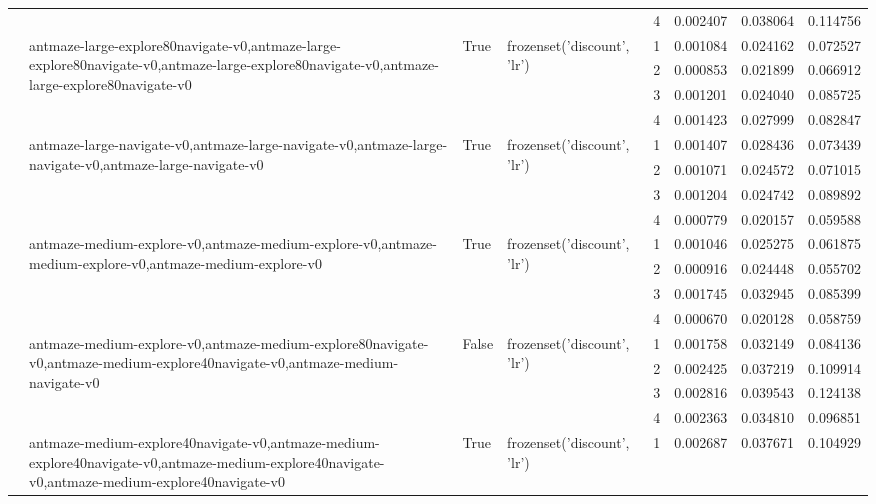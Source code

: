 \begin{tabular}{lllllrrr}
 &  &  &  & 4 & 0.002407 & 0.038064 & 0.114756 \\
\cline{2-8} \cline{3-8} \cline{4-8}
 & \multirow[t]{4}{*}{antmaze-large-explore80navigate-v0,antmaze-large-explore80navigate-v0,antmaze-large-explore80navigate-v0,antmaze-large-explore80navigate-v0} & \multirow[t]{4}{*}{True} & \multirow[t]{4}{*}{frozenset({'discount', 'lr'})} & 1 & 0.001084 & 0.024162 & 0.072527 \\
 &  &  &  & 2 & 0.000853 & 0.021899 & 0.066912 \\
 &  &  &  & 3 & 0.001201 & 0.024040 & 0.085725 \\
 &  &  &  & 4 & 0.001423 & 0.027999 & 0.082847 \\
\cline{2-8} \cline{3-8} \cline{4-8}
 & \multirow[t]{4}{*}{antmaze-large-navigate-v0,antmaze-large-navigate-v0,antmaze-large-navigate-v0,antmaze-large-navigate-v0} & \multirow[t]{4}{*}{True} & \multirow[t]{4}{*}{frozenset({'discount', 'lr'})} & 1 & 0.001407 & 0.028436 & 0.073439 \\
 &  &  &  & 2 & 0.001071 & 0.024572 & 0.071015 \\
 &  &  &  & 3 & 0.001204 & 0.024742 & 0.089892 \\
 &  &  &  & 4 & 0.000779 & 0.020157 & 0.059588 \\
\cline{2-8} \cline{3-8} \cline{4-8}
 & \multirow[t]{4}{*}{antmaze-medium-explore-v0,antmaze-medium-explore-v0,antmaze-medium-explore-v0,antmaze-medium-explore-v0} & \multirow[t]{4}{*}{True} & \multirow[t]{4}{*}{frozenset({'discount', 'lr'})} & 1 & 0.001046 & 0.025275 & 0.061875 \\
 &  &  &  & 2 & 0.000916 & 0.024448 & 0.055702 \\
 &  &  &  & 3 & 0.001745 & 0.032945 & 0.085399 \\
 &  &  &  & 4 & 0.000670 & 0.020128 & 0.058759 \\
\cline{2-8} \cline{3-8} \cline{4-8}
 & \multirow[t]{4}{*}{antmaze-medium-explore-v0,antmaze-medium-explore80navigate-v0,antmaze-medium-explore40navigate-v0,antmaze-medium-navigate-v0} & \multirow[t]{4}{*}{False} & \multirow[t]{4}{*}{frozenset({'discount', 'lr'})} & 1 & 0.001758 & 0.032149 & 0.084136 \\
 &  &  &  & 2 & 0.002425 & 0.037219 & 0.109914 \\
 &  &  &  & 3 & 0.002816 & 0.039543 & 0.124138 \\
 &  &  &  & 4 & 0.002363 & 0.034810 & 0.096851 \\
\cline{2-8} \cline{3-8} \cline{4-8}
 & \multirow[t]{4}{*}{antmaze-medium-explore40navigate-v0,antmaze-medium-explore40navigate-v0,antmaze-medium-explore40navigate-v0,antmaze-medium-explore40navigate-v0} & \multirow[t]{4}{*}{True} & \multirow[t]{4}{*}{frozenset({'discount', 'lr'})} & 1 & 0.002687 & 0.037671 & 0.104929 \\

\end{tabular}
